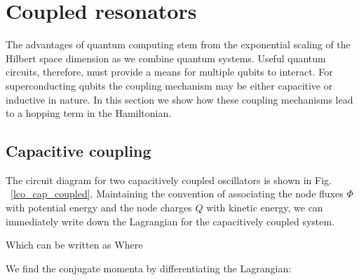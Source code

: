 \section{Coupled resonators}
The advantages of quantum computing stem from the exponential scaling of the Hilbert space dimension as we combine quantum systems.
Useful quantum circuits, therefore, must provide a means for multiple qubits to interact.
For superconducting qubits the coupling mechanism may be either capacitive or inductive in nature.
In this section we show how these coupling mechanisms lead to a hopping term in the Hamiltonian.

\subsection{Capacitive coupling}

The circuit diagram for two capacitively coupled oscillators is shown in Fig.\,~\ref{lco_cap_coupled}.
Maintaining the convention of associating the node fluxes $\Phi$ with potential energy and the node charges $Q$ with kinetic energy,
we can immediately write down the Lagrangian for the capacitively coupled system.

Which can be written as
\noindent
Where

We find the conjugate momenta by differentiating the Lagrangian:

